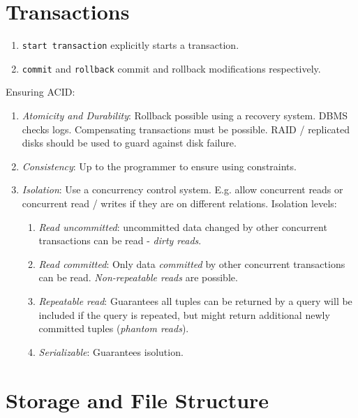 \documentclass[twocolumn,english]{article}
\begin{document}
\section{Transactions}
\begin{enumerate}
\item \texttt{start transaction} explicitly starts a transaction.
\item \texttt{commit} and \texttt{rollback} commit and rollback modifications
respectively.
\end{enumerate}
Ensuring ACID:
\begin{enumerate}
\item \emph{Atomicity and Durability}: Rollback possible using a recovery
system. DBMS checks logs. Compensating transactions must be possible.
RAID / replicated disks should be used to guard against disk failure.
\item \emph{Consistency}: Up to the programmer to ensure using constraints.
\item \emph{Isolation}: Use a concurrency control system. E.g. allow concurrent
reads or concurrent read / writes if they are on different relations.
Isolation levels:

\begin{enumerate}
\item \emph{Read uncommitted}: uncommitted data changed by other concurrent
transactions can be read - \emph{dirty reads}.
\item \emph{Read committed}: Only data \emph{committed} by other concurrent
transactions can be read. \emph{Non-repeatable reads} are possible.
\item \emph{Repeatable read}: Guarantees all tuples can be returned by a
query will be included if the query is repeated, but might return
additional newly committed tuples (\emph{phantom reads}).
\item \emph{Serializable}: Guarantees isolution.
\end{enumerate}
\end{enumerate}

\section{Storage and File Structure}
\end{document}
